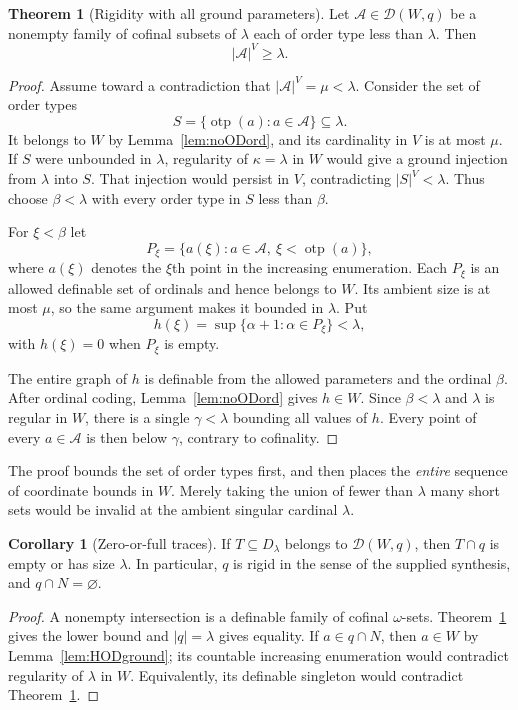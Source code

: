 \documentclass[11pt,letterpaper]{article}
\theoremstyle{definition}
\newtheorem{theorem}[definition]{Theorem}
\newtheorem{corollary}[definition]{Corollary}
\numberwithin{equation}{section}
\newcommand{\DD}{\mathscr D}
\DeclareMathOperator{\otp}{otp}
\begin{document}
\begin{theorem}[Rigidity with all ground parameters]\label{thm:rigid}
Let $\mathcal A\in\DD(W,q)$ be a nonempty family of cofinal subsets of $\lambda$ each of order type less than $\lambda$. Then
\[
 |\mathcal A|^V\geq\lambda.
\]
\end{theorem}
\begin{proof}
Assume toward a contradiction that $|\mathcal A|^V=\mu<\lambda$. Consider the set of order types
\[
 S=\{\otp(a):a\in\mathcal A\}\subseteq\lambda.
\]
It belongs to $W$ by Lemma~\ref{lem:noODord}, and its cardinality in $V$ is at most $\mu$. If $S$ were unbounded in $\lambda$, regularity of $\kappa=\lambda$ in $W$ would give a ground injection from $\lambda$ into $S$. That injection would persist in $V$, contradicting $|S|^V<\lambda$. Thus choose $\beta<\lambda$ with every order type in $S$ less than $\beta$.

For $\xi<\beta$ let
\[
 P_\xi=\{a(\xi):a\in\mathcal A,\ \xi<\otp(a)\},
\]
where $a(\xi)$ denotes the $\xi$th point in the increasing enumeration. Each $P_\xi$ is an allowed definable set of ordinals and hence belongs to $W$. Its ambient size is at most $\mu$, so the same argument makes it bounded in $\lambda$. Put
\[
 h(\xi)=\sup\{\alpha+1:\alpha\in P_\xi\}<\lambda,
\]
with $h(\xi)=0$ when $P_\xi$ is empty.

The entire graph of $h$ is definable from the allowed parameters and the ordinal $\beta$. After ordinal coding, Lemma~\ref{lem:noODord} gives $h\in W$. Since $\beta<\lambda$ and $\lambda$ is regular in $W$, there is a single $\gamma<\lambda$ bounding all values of $h$. Every point of every $a\in\mathcal A$ is then below $\gamma$, contrary to cofinality.
\end{proof}

The proof bounds the set of order types first, and then places the \emph{entire} sequence of coordinate bounds in $W$. Merely taking the union of fewer than $\lambda$ many short sets would be invalid at the ambient singular cardinal $\lambda$.

\begin{corollary}[Zero-or-full traces]\label{cor:full}
If $T\subseteq D_\lambda$ belongs to $\DD(W,q)$, then $T\cap q$ is empty or has size $\lambda$. In particular, $q$ is rigid in the sense of the supplied synthesis, and $q\cap N=\varnothing$.
\end{corollary}
\begin{proof}
A nonempty intersection is a definable family of cofinal $\omega$-sets. Theorem~\ref{thm:rigid} gives the lower bound and $|q|=\lambda$ gives equality. If $a\in q\cap N$, then $a\in W$ by Lemma~\ref{lem:HODground}; its countable increasing enumeration would contradict regularity of $\lambda$ in $W$. Equivalently, its definable singleton would contradict Theorem~\ref{thm:rigid}.
\end{proof}
\end{document}
